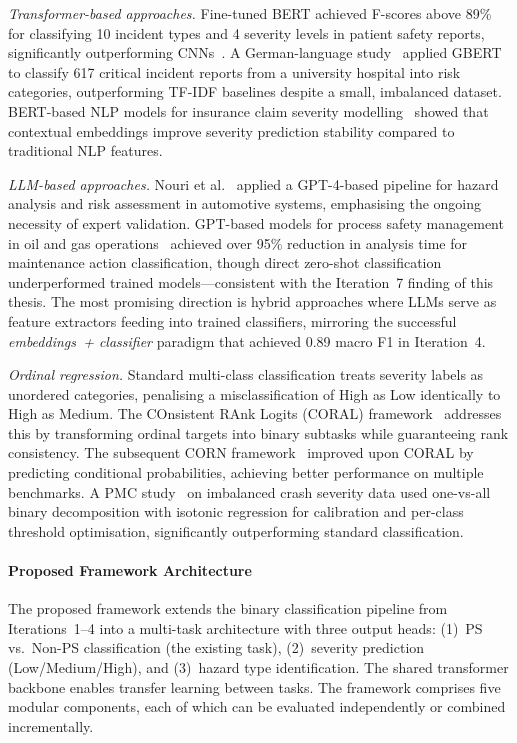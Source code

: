 \documentclass[11pt, titlepage, bibliography=totoc]{scrreprt}
\begin{document}
\textit{Transformer-based approaches.}
Fine-tuned BERT achieved F-scores above 89\% for classifying 10 incident types and 4 severity levels in patient safety reports, significantly outperforming CNNs~\cite{wang2025bert}. A German-language study~\cite{MDPI2025} applied GBERT to classify 617 critical incident reports from a university hospital into risk categories, outperforming TF-IDF baselines despite a small, imbalanced dataset. BERT-based NLP models for insurance claim severity modelling~\cite{Variance2023} showed that contextual embeddings improve severity prediction stability compared to traditional NLP features.

\textit{LLM-based approaches.}
Nouri et al.~\cite{Nouri2024} applied a GPT-4-based pipeline for hazard analysis and risk assessment in automotive systems, emphasising the ongoing necessity of expert validation. GPT-based models for process safety management in oil and gas operations~\cite{SPE2024} achieved over 95\% reduction in analysis time for maintenance action classification, though direct zero-shot classification underperformed trained models---consistent with the Iteration~7 finding of this thesis. The most promising direction is hybrid approaches where LLMs serve as feature extractors feeding into trained classifiers, mirroring the successful \textit{embeddings~+ classifier} paradigm that achieved 0.89 macro F1 in Iteration~4.

\textit{Ordinal regression.}
Standard multi-class classification treats severity labels as unordered categories, penalising a misclassification of High as Low identically to High as Medium. The COnsistent RAnk Logits (CORAL) framework~\cite{Cao2020} addresses this by transforming ordinal targets into binary subtasks while guaranteeing rank consistency. The subsequent CORN framework~\cite{Shi2023} improved upon CORAL by predicting conditional probabilities, achieving better performance on multiple benchmarks. A PMC study~\cite{PMC2021} on imbalanced crash severity data used one-vs-all binary decomposition with isotonic regression for calibration and per-class threshold optimisation, significantly outperforming standard classification.

\paragraph{Proposed Framework Architecture}
The proposed framework extends the binary classification pipeline from Iterations~1--4 into a multi-task architecture with three output heads: (1)~PS vs.\ Non-PS classification (the existing task), (2)~severity prediction (Low/Medium/High), and (3)~hazard type identification. The shared transformer backbone enables transfer learning between tasks. The framework comprises five modular components, each of which can be evaluated independently or combined incrementally.
\end{document}
